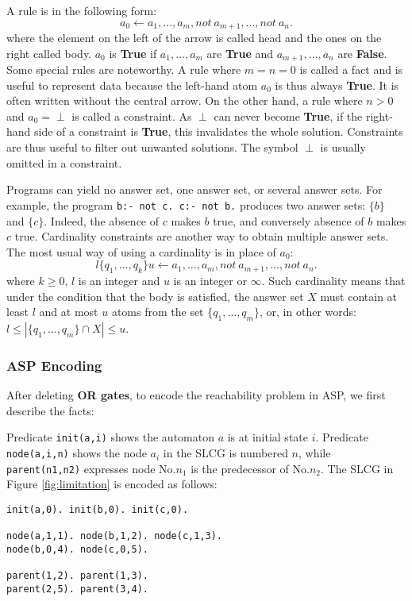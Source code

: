 A rule is in the following form:
$$a_0 \gets a_1 , \ldots , a_m, not\ a_{m+1}, \ldots , not\ a_n.$$
where the element on the left of the arrow is called head and the ones on the right called body.
$a_0$ is \textbf{True} if $a_1 , \ldots , a_m$ are \textbf{True} and $a_{m+1}, \ldots , a_n$ are \textbf{False}.
Some special rules are noteworthy. 
A rule where $m = n = 0$ is called a fact and is useful to represent data because the left-hand atom $a_0$ is thus always \textbf{True}.
It is often written without the central arrow.
On the other hand, a rule where $n > 0$ and $a_0 = \perp$ is called a constraint.
As $\perp$ can never become \textbf{True}, if the right-hand side of a constraint is \textbf{True}, this invalidates the whole solution.
Constraints are thus useful to filter out unwanted solutions.
The symbol $\perp$ is usually omitted in a constraint.

Programs can yield no answer set, one answer set, or several answer sets. 
For example, the program \texttt{b:- not c. c:- not b.}  produces two answer sets: $\{b\}$ and $\{c\}$.
Indeed, the absence of $c$ makes $b$ true, and conversely absence of $b$ makes $c$ true. 
Cardinality constraints are another way to obtain multiple answer sets. 
The most usual way of using a cardinality is in place of $a_0$:
$$l \{q_1, \ldots , q_k \} u \gets a_1, \ldots , a_m, not\ a_{m+1}, \ldots , not\ a_n.$$
where $k \geq 0$, $l$ is an integer and $u$ is an integer or $\infty$. 
Such cardinality means that under the condition that the body is satisfied, the answer set $X$ must contain at least $l$ and at most $u$ atoms from the set $\{q_1, \ldots  , q_m\}$, or, in other words: $l \leq |\{q_1, \ldots  , q_m\} \cap X| \leq u$. %

\subsubsection*{ASP Encoding}

After deleting \textbf{OR gates}, to encode the reachability problem in ASP, we first describe the facts:

Predicate \texttt{init(a,i)} shows the automaton $a$ is at initial state $i$. %
Predicate \texttt{node(a,i,n)} shows the node $a_i$ in the SLCG is numbered $n$, while \texttt{parent(n1,n2)} expresses node No.$n_1$ is the predecessor of No.$n_2$.
The SLCG in Figure \ref{fig:limitation} is encoded as follows:
\begin{Verbatim}[commandchars=\\\{\}]
init(a,0). init(b,0). init(c,0).

node(a,1,1). node(b,1,2). node(c,1,3).
node(b,0,4). node(c,0,5).

parent(1,2). parent(1,3).
parent(2,5). parent(3,4).
\end{Verbatim}

